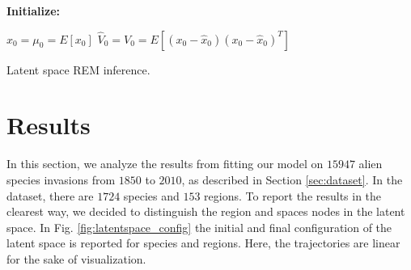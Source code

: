 \documentclass[mscthesis]{usiinfthesis}
\begin{document}
\begin{algorithm}[H]

\textbf{Initialize: }
\begin{substeps}
$\hat{x}_0 = \mu_0 = E[x_0]$ \;
$\hat{V}_0 = V_0 = E[(x_0-\hat{x}_0)(x_0-\hat{x}_0)^T]$  \;
\end{substeps}
\caption{Latent space REM inference.}
\label{algo:rem_latent}
\end{algorithm}



%

\chapter{Results}

In this section, we analyze the results from fitting our model on $15947$ alien species invasions from $1850$ to $2010$, as described in Section \ref{sec:dataset}. In the dataset, there are $1724$ species and $153$ regions. To report the results in the clearest way, we decided to distinguish the region and spaces nodes in the latent space. In Fig. \ref{fig:latentspace_config} the initial and final configuration of the latent space is reported for species and regions. Here, the trajectories are linear for the sake of visualization.
\end{document}
